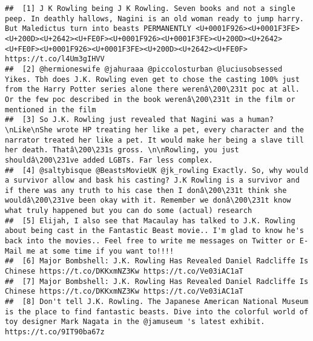 \documentclass[]{article}
\begin{document}
\begin{verbatim}
##  [1] J K Rowling being J K Rowling. Seven books and not a single peep. In deathly hallows, Nagini is an old woman ready to jump harry. But Maledictus turn into beasts PERMANENTLY <U+0001F926><U+0001F3FE><U+200D><U+2642><U+FE0F><U+0001F926><U+0001F3FE><U+200D><U+2642><U+FE0F><U+0001F926><U+0001F3FE><U+200D><U+2642><U+FE0F> https://t.co/l4Um3gIHVV
##  [2] @hermioneswife @jahuraaa @piccolosturban @luciusobsessed Yikes. Tbh does J.K. Rowling even get to chose the casting 100% just from the Harry Potter series alone there werenâ\200\231t poc at all. Or the few poc described in the book werenâ\200\231t in the film or mentioned in the film                                                                      
##  [3] So J.K. Rowling just revealed that Nagini was a human?\nLike\nShe wrote HP treating her like a pet, every character and the narrator treated her like a pet. It would make her being a slave till her death. Thatâ\200\231s gross. \n\nRowling, you just shouldâ\200\231ve added LGBTs. Far less complex.                                                         
##  [4] @saltybisque @BeastsMovieUK @jk_rowling Exactly. So, why would a survivor allow and bask his casting? J.K Rowling is a survivor and if there was any truth to his case then I donâ\200\231t think she wouldâ\200\231ve been okay with it. Remember we donâ\200\231t know what truly happened but you can do some (actual) research                                      
##  [5] Elijah, I also see that Macaulay has talked to J.K. Rowling about being cast in the Fantastic Beast movie.. I'm glad to know he's back into the movies.. Feel free to write me messages on Twitter or E-Mail me at some time if you want to!!!!                                                                                                       
##  [6] Major Bombshell: J.K. Rowling Has Revealed Daniel Radcliffe Is Chinese https://t.co/DKKxmNZ3Kw https://t.co/Ve03iAC1aT                                                                                                                                                                                                                                
##  [7] Major Bombshell: J.K. Rowling Has Revealed Daniel Radcliffe Is Chinese https://t.co/DKKxmNZ3Kw https://t.co/Ve03iAC1aT                                                                                                                                                                                                                                
##  [8] Don't tell J.K. Rowling. The Japanese American National Museum is the place to find fantastic beasts. Dive into the colorful world of toy designer Mark Nagata in the @jamuseum 's latest exhibit.  https://t.co/9IT90ba67z                                                                                                                           

\end{verbatim}
\end{document}
